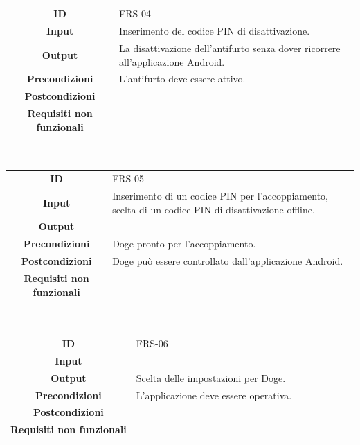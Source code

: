 \documentclass{article}
\begin{document}
~

\begin{adjustbox}{center}
\begin{tabular}{|c|p{10cm}|}
\hline
\textbf{ID} & FRS-04 \\
\textbf{Input} & Inserimento del codice PIN di disattivazione.\\
\textbf{Output} & La disattivazione dell'antifurto senza dover ricorrere all'applicazione Android.\\
\textbf{Precondizioni} & L'antifurto deve essere attivo.\\
\textbf{Postcondizioni} &\\
\textbf{Requisiti non funzionali} &\\
\hline
\end{tabular}
\end{adjustbox}

~

\begin{adjustbox}{center}
\begin{tabular}{|c|p{10cm}|}
\hline
\textbf{ID} & FRS-05 \\
\textbf{Input} & Inserimento di un codice PIN per l'accoppiamento, scelta di un codice PIN di disattivazione offline. \\
\textbf{Output} &  \\
\textbf{Precondizioni} & Doge pronto per l'accoppiamento. \\
\textbf{Postcondizioni} & Doge può essere controllato dall'applicazione Android. \\
\textbf{Requisiti non funzionali} &  \\
\hline
\end{tabular}
\end{adjustbox}

~

\begin{adjustbox}{center}
\begin{tabular}{|c|p{10cm}|}
\hline
\textbf{ID} & FRS-06\\
\textbf{Input} &\\
\textbf{Output} & Scelta delle impostazioni per Doge.\\
\textbf{Precondizioni} & L'applicazione deve essere operativa.\\
\textbf{Postcondizioni} &\\
\textbf{Requisiti non funzionali} &\\
\hline
\end{tabular}
\end{adjustbox}
\end{document}
